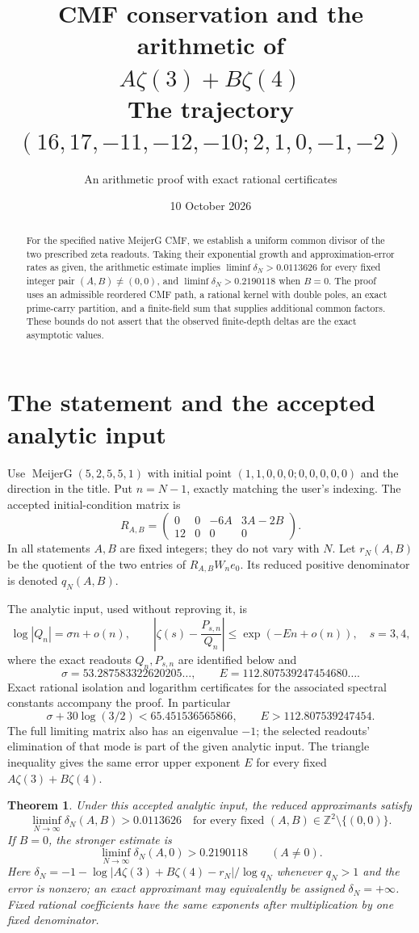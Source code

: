 \documentclass[11pt]{article}
\title{CMF conservation and the arithmetic of\\$A\zeta(3)+B\zeta(4)$\\\large The trajectory $(16,17,-11,-12,-10;2,1,0,-1,-2)$}
\author{An arithmetic proof with exact rational certificates}
\date{10 October 2026}
\newtheorem{theorem}{Theorem}
\newcommand{\Z}{\mathbb Z}
\begin{document}
\maketitle
\begin{abstract}
For the specified native MeijerG CMF, we establish a uniform common
divisor of the two prescribed zeta readouts. Taking their exponential
growth and approximation-error rates as given, the arithmetic estimate
implies $\liminf\delta_N>0.0113626$ for every fixed integer pair
$(A,B)\ne(0,0)$, and $\liminf\delta_N>0.2190118$ when $B=0$.
The proof uses an admissible reordered CMF path, a rational kernel with
double poles, an exact prime-carry partition, and a finite-field sum
that supplies additional common factors. These bounds do not assert
that the observed finite-depth deltas are the exact asymptotic values.
\end{abstract}

\section{The statement and the accepted analytic input}
Use $\operatorname{MeijerG}(5,2,5,5,1)$ with initial point
$(1,1,0,0,0;0,0,0,0,0)$ and the direction in the title. Put $n=N-1$,
exactly matching the user's indexing. The accepted initial-condition
matrix is
\[
 R_{A,B}=\begin{pmatrix}0&0&-6A&3A-2B\\12&0&0&0\end{pmatrix}.
\]
In all statements $A,B$ are fixed integers; they do not vary with $N$.
Let $r_N(A,B)$ be the quotient of the two entries of $R_{A,B}W_ne_0$.
Its reduced positive denominator is denoted $q_N(A,B)$.

The analytic input, used without reproving it, is
\[
 \log|Q_n|=\sigma n+o(n),\qquad
 \left|\zeta(s)-\frac{P_{s,n}}{Q_n}\right|
       \le \exp(-En+o(n)),\quad s=3,4,
\]
where the exact readouts $Q_n,P_{s,n}$ are identified below and
\[
 \sigma=53.287583322620205\ldots,\qquad
 E=112.807539247454680\ldots .
\]
Exact rational isolation and logarithm certificates for the associated
spectral constants accompany the proof. In particular
\[
 \sigma+30\log(3/2)<65.451536565866,\qquad E>112.807539247454.
\]
The full limiting matrix also has an eigenvalue $-1$; the selected
readouts' elimination of that mode is part of the given analytic input.
The triangle inequality gives the same error upper exponent $E$ for
every fixed $A\zeta(3)+B\zeta(4)$.

\begin{theorem}
Under this accepted analytic input, the reduced approximants satisfy
\[
 \boxed{\liminf_{N\to\infty}\delta_N(A,B)>0.0113626}
 \quad\text{for every fixed }(A,B)\in\Z^2\setminus\{(0,0)\}.
\]
If $B=0$, the stronger estimate is
\[
 \boxed{\liminf_{N\to\infty}\delta_N(A,0)>0.2190118}\qquad(A\ne0).
\]
Here $\delta_N=-1-\log|A\zeta(3)+B\zeta(4)-r_N|/\log q_N$ whenever
$q_N>1$ and the error is nonzero; an exact approximant may equivalently
be assigned $\delta_N=+\infty$. Fixed rational coefficients have the same
exponents after multiplication by one fixed denominator.
\end{theorem}
\end{document}
